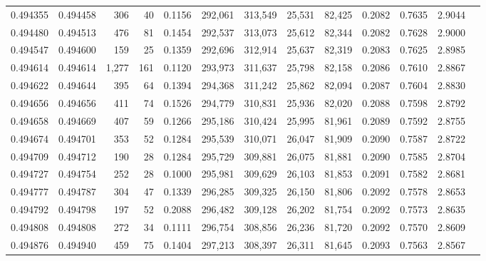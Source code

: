 \begin{tabular}{rrrrrrrrrrrrr}
0.494355 & 0.494458 &   306 &    40 &                                     0.1156 & 292,061 & 313,549 &  25,531 &  82,425 & 0.2082 & 0.7635 & 2.9044 \\
0.494480 & 0.494513 &   476 &    81 &                                     0.1454 & 292,537 & 313,073 &  25,612 &  82,344 & 0.2082 & 0.7628 & 2.9000 \\
0.494547 & 0.494600 &   159 &    25 &                                     0.1359 & 292,696 & 312,914 &  25,637 &  82,319 & 0.2083 & 0.7625 & 2.8985 \\
0.494614 & 0.494614 & 1,277 &   161 &                                     0.1120 & 293,973 & 311,637 &  25,798 &  82,158 & 0.2086 & 0.7610 & 2.8867 \\
0.494622 & 0.494644 &   395 &    64 &                                     0.1394 & 294,368 & 311,242 &  25,862 &  82,094 & 0.2087 & 0.7604 & 2.8830 \\
0.494656 & 0.494656 &   411 &    74 &                                     0.1526 & 294,779 & 310,831 &  25,936 &  82,020 & 0.2088 & 0.7598 & 2.8792 \\
0.494658 & 0.494669 &   407 &    59 &                                     0.1266 & 295,186 & 310,424 &  25,995 &  81,961 & 0.2089 & 0.7592 & 2.8755 \\
0.494674 & 0.494701 &   353 &    52 &                                     0.1284 & 295,539 & 310,071 &  26,047 &  81,909 & 0.2090 & 0.7587 & 2.8722 \\
0.494709 & 0.494712 &   190 &    28 &                                     0.1284 & 295,729 & 309,881 &  26,075 &  81,881 & 0.2090 & 0.7585 & 2.8704 \\
0.494727 & 0.494754 &   252 &    28 &                                     0.1000 & 295,981 & 309,629 &  26,103 &  81,853 & 0.2091 & 0.7582 & 2.8681 \\
0.494777 & 0.494787 &   304 &    47 &                                     0.1339 & 296,285 & 309,325 &  26,150 &  81,806 & 0.2092 & 0.7578 & 2.8653 \\
0.494792 & 0.494798 &   197 &    52 &                                     0.2088 & 296,482 & 309,128 &  26,202 &  81,754 & 0.2092 & 0.7573 & 2.8635 \\
0.494808 & 0.494808 &   272 &    34 &                                     0.1111 & 296,754 & 308,856 &  26,236 &  81,720 & 0.2092 & 0.7570 & 2.8609 \\
0.494876 & 0.494940 &   459 &    75 &                                     0.1404 & 297,213 & 308,397 &  26,311 &  81,645 & 0.2093 & 0.7563 & 2.8567 \\

\end{tabular}
